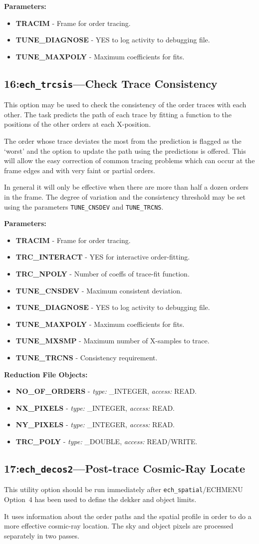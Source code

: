 \documentclass[11pt,twoside]{article}
\makeatletter
\newcommand{\stardocinitials}  {SUN}
\newcommand{\stardocnumber}    {152.4}
\newcommand{\stardocname}{\stardocinitials /\stardocnumber}
\newcommand{\htmlref}[2]{#1}
\newcommand{\xlabel}[1]{}
\newcommand{\myindex}[1]{\index{#1}}
\newcommand{\indexcmdname}[1]{\index{#1@\protect\cmdname{#1}}}
\renewcommand{\myindex}[1]{}
\renewcommand{\indexcmdname}[1]{}
\newcommand{\cmdname}{\begingroup \catcode`\_=12 \realcmdname}
\newcommand{\realcmdname}[1]{\endgroup\texttt{#1}}
\newlength{\sstbannerlength}
\newlength{\sstcaptionlength}
\newcommand{\echtask}[4]{
   \goodbreak
   \rule{\textwidth}{0.5mm}
   \vspace{-7ex}
   \newline
   \settowidth{\sstbannerlength}{{\Large {\bf #3}}}
   \setlength{\sstcaptionlength}{\textwidth}
   \addtolength{\sstbannerlength}{0.5em}
   \addtolength{\sstcaptionlength}{-2.0\sstbannerlength}
   \addtolength{\sstcaptionlength}{-5.0pt}
   \parbox[t]{\sstbannerlength}{\flushleft{\Large {\bf #3}}}
   \parbox[t]{\sstcaptionlength}{\center{\Large #4}}
   \parbox[t]{\sstbannerlength}{\flushright{\Large {\bf #3}}}
   \label{#1}\label{#2}
   \markboth{#3}{\stardocname}
   \uppercase{\myindex{#2@\protect\cmdname{#2}}}
}
\renewcommand{\echtask}[4]
{
  \subsection{\xlabel{#1}\xlabel{#2}\label{#1}\label{#2}#3---#4}
  \markboth{#3}{\stardocname}
}
\newcommand{\echpars}[1]{
{\bf Parameters:\vspace*{6pt}\\}
    #1
}
\renewcommand{\echpars}[1]{
{\bf Parameters:}
\begin{itemize}
#1
\end{itemize}
}
\newcommand{\epar}[3]
{
    \hspace*{5mm}\makebox[50mm][l]{\bf #1} #2 (p~\pageref{par_#3}.)\\
}
\renewcommand{\epar}[3]
{\item \htmlref{{\bf #1}}{par_#3} - #2}
\newcommand{\lepar}[3]
{
    \hspace*{5mm}\makebox[50mm][l]{\bf #1} #2 (p~\pageref{par_#3}.)
}
\renewcommand{\lepar}[3]
{\item \htmlref{{\bf #1}}{par_#3} - #2}
\newcommand{\echredobj}[1]{
{\bf Reduction File Objects:\vspace*{6pt}\\}
      \hspace*{5mm}\makebox[50mm][l]{Object}\makebox[25mm][l]{Type}{Access}\\
      #1
}
\renewcommand{\echredobj}[1]{
{\bf Reduction File Objects:}
\begin{itemize}
#1
\end{itemize}
}
\newcommand{\eobj}[3]
{
    \hspace*{5mm}\makebox[50mm][l]{\bf #1}\makebox[25mm][l]{\tt #2}{\tt #3}\\
}
\renewcommand{\eobj}[3]
{\item {\bf #1} - {\it type:} #2, {\it access:} #3.}
\newcommand{\leobj}[3]
{
    \hspace*{5mm}\makebox[50mm][l]{\bf #1}\makebox[25mm][l]{\tt #2}{\tt #3}
}
\renewcommand{\leobj}[3]
{\item {\bf #1} - {\it type:} #2, {\it access:} #3.}
\makeatother
\begin{document}
\echpars{
\epar{TRACIM}{Frame for order tracing.}{TRACIM}
\epar{TUNE\_DIAGNOSE}{YES to log activity to debugging file.}{TUNE_DIAGNOSE}
\lepar{TUNE\_MAXPOLY}{Maximum coefficients for fits.}{TUNE_MAXPOLY}
}

\echtask{option16}{ech_trcsis}{16:{\tt ech\_trcsis}}{Check Trace Consistency}
\myindex{Order!traces consistency check}
\myindex{Trace!consistency}

This option may be used to check the consistency of the order traces with
each other. The task predicts the path of each trace by fitting a function
to the positions of the other orders at each X-position.

The order whose trace deviates the most from the prediction is flagged as
the `worst' and the option to update the path using the predictions is
offered. This will allow the easy correction of common tracing problems
which can occur at the frame edges and with very faint or partial orders.

\indexcmdname{TUNE_CNSDEV}
\indexcmdname{TUNE_TRCNS}
In general it will only be effective when there are more than half a dozen
orders in the frame. The degree of variation and the consistency threshold
may be set using the parameters \htmlref{{\tt TUNE\_CNSDEV}}{par_TUNE_CNSDEV}
and \htmlref{{\tt TUNE\_TRCNS}}{par_TUNE_TRCNS}\@.

\echpars{
\epar{TRACIM}{Frame for order tracing.}{TRACIM}
\epar{TRC\_INTERACT}{YES for interactive order-fitting.}{TRC_INTERACT}
\epar{TRC\_NPOLY}{Number of coeffs of trace-fit function.}{TRC_NPOLY}
\epar{TUNE\_CNSDEV}{Maximum consistent deviation.}{TUNE_CNSDEV}
\epar{TUNE\_DIAGNOSE}{YES to log activity to debugging file.}{TUNE_DIAGNOSE}
\epar{TUNE\_MAXPOLY}{Maximum coefficients for fits.}{TUNE_MAXPOLY}
\epar{TUNE\_MXSMP}{Maximum number of X-samples to trace.}{TUNE_MXSMP}
\lepar{TUNE\_TRCNS}{Consistency requirement.}{TUNE_TRCNS}
}

\echredobj{
\eobj{NO\_OF\_ORDERS}{\_INTEGER}{READ}
\eobj{NX\_PIXELS}{\_INTEGER}{READ}
\eobj{NY\_PIXELS}{\_INTEGER}{READ}
\leobj{TRC\_POLY}{\_DOUBLE}{READ/WRITE}
}


\echtask{option17}{ech_decos2}{17:{\tt ech\_decos2}}{Post-trace Cosmic-Ray
  Locate}
\myindex{Cosmic rays!post-trace location}

This utility option should be run immediately after
\htmlref{{\tt ech\_spatial}/ECHMENU Option~4}{ech_spatial}
has been used to define the dekker and  object limits.

It uses information about the order paths and the spatial profile in order
to do a more effective cosmic-ray location. The sky and object pixels are
processed separately in two passes.
\end{document}
